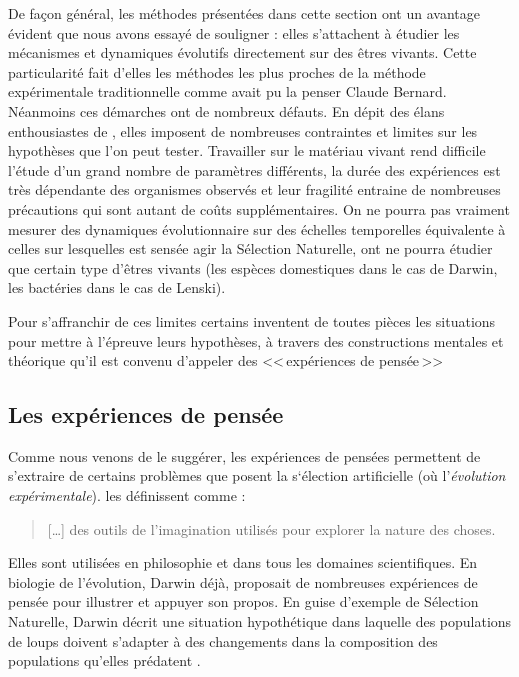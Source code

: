 De façon général, les méthodes présentées dans cette section ont un avantage évident que nous avons essayé de souligner : elles s'attachent à étudier les mécanismes et dynamiques évolutifs directement sur des êtres vivants. Cette particularité fait d'elles les méthodes les plus proches de la méthode expérimentale traditionnelle comme avait pu la penser Claude Bernard. Néanmoins ces démarches ont de nombreux défauts. En dépit des élans enthousiastes de \cite{lenski94dynamicsadaptationdiversification10000generationexperimentbacterialpopulations}, elles imposent de nombreuses contraintes et limites sur les hypothèses que l'on peut tester. Travailler sur le matériau vivant rend difficile l'étude d'un grand nombre de paramètres différents, la durée des expériences est très dépendante des organismes observés et leur fragilité entraine de nombreuses précautions qui sont autant de coûts supplémentaires. On ne pourra pas vraiment mesurer des dynamiques évolutionnaire sur des échelles temporelles équivalente à celles sur lesquelles est sensée agir la Sélection Naturelle, ont ne pourra étudier que certain type d'êtres vivants (les espèces domestiques dans le cas de Darwin, les bactéries dans le cas de Lenski).

Pour s'affranchir de ces limites certains inventent de toutes pièces les situations pour mettre à l'épreuve leurs hypothèses, à travers des constructions mentales et théorique qu'il est convenu d'appeler des <<\,expériences de pensée\,>>

\subsection{Les expériences de pensée}\label{sec:cmpdr:te}

Comme nous venons de le suggérer, les expériences de pensées permettent de s'extraire de certains problèmes que posent la s`élection artificielle (où l'\emph{évolution expérimentale}). 
\cite{brown2011thoughtexperiments} les définissent comme :
\begin{quote}
	[\ldots] des outils de l'imagination utilisés pour explorer la nature des choses.
\end{quote}

Elles sont utilisées en philosophie et dans tous les domaines scientifiques. En biologie de l'évolution, Darwin déjà, proposait de nombreuses expériences de pensée pour illustrer et appuyer son propos. En guise d'exemple de Sélection Naturelle, Darwin décrit une situation hypothétique dans laquelle des populations de loups doivent s'adapter à des changements dans la composition des populations qu'elles prédatent \citep[p. 102]{darwin1859originspeciesbymeansnaturalselectionorpreservationfavouredracesstrugglelife}.

